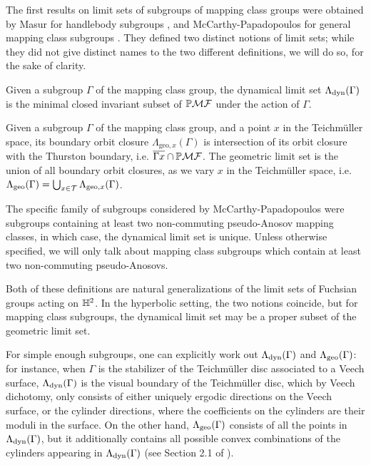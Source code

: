 \documentclass[12pt, reqno]{amsart}
\begin{document}
The first results on limit sets of subgroups of mapping class groups were obtained by Masur for handlebody subgroups \cite{masur_1986}, and McCarthy-Papadopoulos for general mapping class subgroups \cite{McCarthy1989}.
They defined two distinct notions of limit sets; while they did not give distinct names to the two different definitions, we will do so, for the sake of clarity.
\begin{definition}
  Given a subgroup $\Gamma$ of the mapping class group, the dynamical limit set $\Lambda_{\mathrm{dyn}}(\Gamma)$ is the minimal closed invariant subset of $\mathbb{P}\mathcal{MF}$ under the action of $\Gamma$.
\end{definition}
\begin{definition}
  Given a subgroup $\Gamma$ of the mapping class group, and a point $x$ in the Teichmüller space, its boundary orbit closure $\Lambda_{\mathrm{geo}, x}(\Gamma)$ is intersection of its orbit closure with the Thurston boundary, i.e. $\overline{\Gamma x} \cap \mathbb{P}\mathcal{MF}$.
  The geometric limit set is the union of all boundary orbit closures, as we vary $x$ in the Teichmüller space, i.e. $\Lambda_{\mathrm{geo}}(\Gamma) = \bigcup_{x \in \mathcal{T}} \Lambda_{\mathrm{geo}, x}(\Gamma)$.
\end{definition}

\begin{remark}
  The specific family of subgroups considered by McCarthy-Papadopoulos were subgroups containing at least two non-commuting pseudo-Anosov mapping classes, in which case, the dynamical limit set is unique.
  Unless otherwise specified, we will only talk about mapping class subgroups which contain at least two non-commuting pseudo-Anosovs.
\end{remark}

Both of these definitions are natural generalizations of the limit sets of Fuchsian groups acting on $\mathbb{H}^2$.
In the hyperbolic setting, the two notions coincide, but for mapping class subgroups, the dynamical limit set may be a proper subset of the geometric limit set.

For simple enough subgroups, one can explicitly work out $\Lambda_{\mathrm{dyn}}(\Gamma)$ and $\Lambda_{\mathrm{geo}}(\Gamma)$: for instance, when $\Gamma$ is the stabilizer of the Teichmüller disc associated to a Veech surface, $\Lambda_{\mathrm{dyn}}(\Gamma)$ is the visual boundary of the Teichmüller disc, which by Veech dichotomy, only consists of either uniquely ergodic directions on the Veech surface, or the cylinder directions, where the coefficients on the cylinders are their moduli in the surface.
On the other hand, $\Lambda_{\mathrm{geo}}(\Gamma)$ consists of all the points in $\Lambda_{\mathrm{dyn}}(\Gamma)$, but it additionally contains all possible convex combinations of the cylinders appearing in $\Lambda_{\mathrm{dyn}}(\Gamma)$ (see Section 2.1 of \cite{2007math......2034K}).
\end{document}
